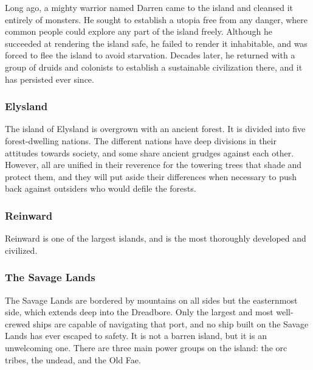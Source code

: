             Long ago, a mighty warrior named Darren came to the island and cleansed it entirely of monsters.
            He sought to establish a utopia free from any danger, where common people could explore any part of the island freely.
            Although he succeeded at rendering the island safe, he failed to render it inhabitable, and was forced to flee the island to avoid starvation.
            Decades later, he returned with a group of druids and colonists to establish a sustainable civilization there, and it has persisted ever since.
            
        \subsubsection{Elysland}
            The island of Elysland is overgrown with an ancient forest.
            It is divided into five forest-dwelling nations.
            The different nations have deep divisions in their attitudes towards society, and some share ancient grudges against each other.
            However, all are unified in their reverence for the towering trees that shade and protect them, and they will put aside their differences when necessary to push back against outsiders who would defile the forests.

        \subsubsection{Reinward}
            Reinward is one of the largest islands, and is the most thoroughly developed and civilized.

        \subsubsection{The Savage Lands}
            The Savage Lands are bordered by mountains on all sides but the easternmost side, which extends deep into the Dreadbore.
            Only the largest and most well-crewed ships are capable of navigating that port, and no ship built on the Savage Lands has ever escaped to safety.
            It is not a barren island, but it is an unwelcoming one.
            There are three main power groups on the island: the orc tribes, the undead, and the Old Fae.
